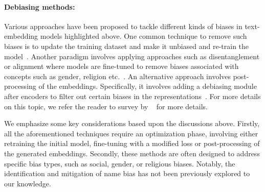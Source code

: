 \paragraph{Debiasing methods:} Various approaches have been proposed to tackle different kinds of biases in text-embedding models highlighted above. One common technique to remove such biases is to update the training dataset and make it unbiased and re-train the model~\citep{brunet2019understanding, ngo2021mitigating}. Another paradigm involves applying approaches such as disentanglement or alignment where models are fine-tuned to remove biases associated with concepts such as gender, religion etc.~\citep{kaneko2021debiasing, guo2022auto, kenneweg2024debiasing}. 
An alternative approach involves post-processing of the embeddings. Specifically, it involves adding a debiasing module after encoders to filter out certain biases in the representations~\citet{cheng2021fairfil}. For more details on this topic, we refer the reader to survey by ~\citet{li2023survey} for more details.

We  emphasize some key considerations based upon the discussions above. Firstly, all the aforementioned techniques require an optimization phase, involving either retraining the initial model, fine-tuning with a modified loss or post-processing of the generated embeddings. Secondly, these methods are often designed to address specific bias types, such as social, gender, or religious biases. Notably, the identification and mitigation of name bias has not been previously explored to our knowledge.